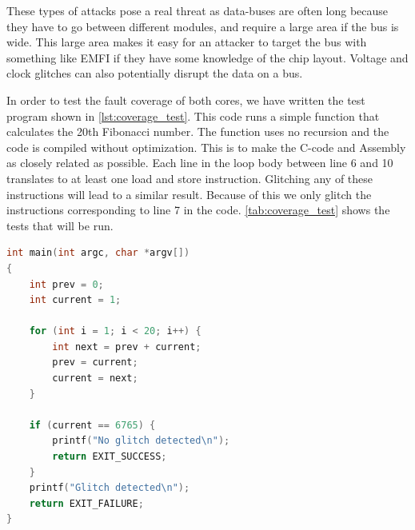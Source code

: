 These types of attacks pose a real threat as data-buses are often long because they have to go between different modules, and require a large area if the bus is wide. This large area makes it easy for an attacker to target the bus with something like EMFI\cite{emfi_injection} if they have some knowledge of the chip layout. Voltage and clock glitches can also potentially disrupt the data on a bus\cite{bus_glitch}. 

In order to test the fault coverage of both cores, we have written the test program shown in \autoref{lst:coverage_test}. This code runs a simple function that calculates the 20th Fibonacci number. The function uses no recursion and the code is compiled without optimization. This is to make the C-code and Assembly as closely related as possible. Each line in the loop body between line 6 and 10 translates to at least one load and store instruction. Glitching any of these instructions will lead to a similar result. Because of this we only glitch the instructions corresponding to line 7 in the code. \autoref{tab:coverage_test} shows the tests that will be run. 


\begin{lstlisting}[caption={Test code for simulating glitch in address-bus.}, label=lst:coverage_test, language=C++]
int main(int argc, char *argv[])
{
    int prev = 0;
    int current = 1;

    for (int i = 1; i < 20; i++) {
        int next = prev + current;
        prev = current;
        current = next;
    }

    if (current == 6765) {
        printf("No glitch detected\n");
        return EXIT_SUCCESS;
    }
    printf("Glitch detected\n");
    return EXIT_FAILURE;
}
\end{lstlisting}

